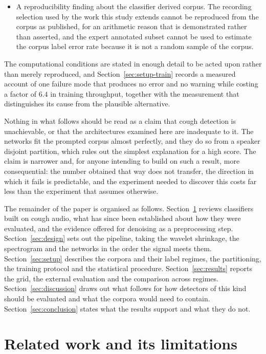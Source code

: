 \documentclass[pdflatex,sn-mathphys-num]{sn-jnl}
\begin{document}
\begin{itemize}
\item A reproducibility finding about the classifier derived corpus. The recording
      selection used by the work this study extends cannot be reproduced from the corpus as
      published, for an arithmetic reason that is demonstrated rather than asserted, and
      the expert annotated subset cannot be used to estimate the corpus label error rate
      because it is not a random sample of the corpus.

\end{itemize}

The computational conditions are stated in enough detail to be acted upon rather than
merely reproduced, and Section~\ref{sec:setup-train} records a measured account of one
failure mode that produces no error and no warning while costing a factor of $6.4$ in
training throughput, together with the measurement that distinguishes its cause from the
plausible alternative.

Nothing in what follows should be read as a claim that cough detection is unachievable, or
that the architectures examined here are inadequate to it. The networks fit the prompted
corpus almost perfectly, and they do so from a speaker disjoint partition, which rules out
the simplest explanation for a high score. The claim is narrower and, for anyone intending
to build on such a result, more consequential: the number obtained that way does not
transfer, the direction in which it fails is predictable, and the experiment needed to
discover this costs far less than the experiment that assumes otherwise.

The remainder of the paper is organised as follows.
Section~\ref{sec:related} reviews classifiers built on cough audio, what has since been
established about how they were evaluated, and the evidence offered for denoising as a
preprocessing step. Section~\ref{sec:design} sets out the pipeline, taking the wavelet
shrinkage, the spectrogram and the networks in the order the signal meets them.
Section~\ref{sec:setup} describes the corpora and their label regimes, the partitioning,
the training protocol and the statistical procedure. Section~\ref{sec:results} reports the
grid, the external evaluation and the comparison across regimes.
Section~\ref{sec:discussion} draws out what follows for how detectors of this kind should
be evaluated and what the corpora would need to contain.
Section~\ref{sec:conclusion} states what the results support and what they do not.

\section{Related work and its limitations}\label{sec:related}
\end{document}
